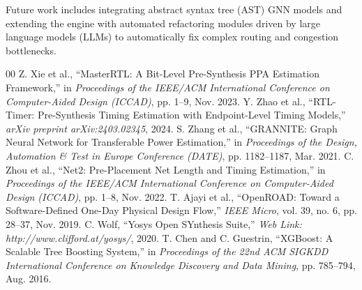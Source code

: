 \documentclass[conference]{IEEEtran}
\begin{document}
Future work includes integrating abstract syntax tree (AST) GNN models and extending the engine with automated refactoring modules driven by large language models (LLMs) to automatically fix complex routing and congestion bottlenecks.

\begin{thebibliography}{00}
 Z. Xie et al., ``MasterRTL: A Bit-Level Pre-Synthesis PPA Estimation Framework,'' in \textit{Proceedings of the IEEE/ACM International Conference on Computer-Aided Design (ICCAD)}, pp. 1--9, Nov. 2023.
 Y. Zhao et al., ``RTL-Timer: Pre-Synthesis Timing Estimation with Endpoint-Level Timing Models,'' \textit{arXiv preprint arXiv:2403.02345}, 2024.
 S. Zhang et al., ``GRANNITE: Graph Neural Network for Transferable Power Estimation,'' in \textit{Proceedings of the Design, Automation \& Test in Europe Conference (DATE)}, pp. 1182--1187, Mar. 2021.
 C. Zhou et al., ``Net2: Pre-Placement Net Length and Timing Estimation,'' in \textit{Proceedings of the IEEE/ACM International Conference on Computer-Aided Design (ICCAD)}, pp. 1--8, Nov. 2022.
 T. Ajayi et al., ``OpenROAD: Toward a Software-Defined One-Day Physical Design Flow,'' \textit{IEEE Micro}, vol. 39, no. 6, pp. 28--37, Nov. 2019.
 C. Wolf, ``Yosys Open SYnthesis Suite,'' \textit{Web Link: http://www.clifford.at/yosys/}, 2020.
 T. Chen and C. Guestrin, ``XGBoost: A Scalable Tree Boosting System,'' in \textit{Proceedings of the 22nd ACM SIGKDD International Conference on Knowledge Discovery and Data Mining}, pp. 785--794, Aug. 2016.
\end{thebibliography}
\end{document}
